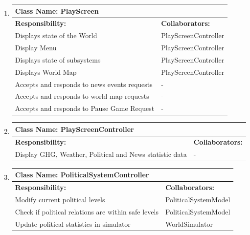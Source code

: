 \documentclass[]{article}
\begin{document}
\begin{enumerate}[1.]
\begin{tabular}{|p{10cm}|p{4cm}|}
	    \hline
	  \end{tabular}

	\item
	\begin{tabular}{|p{10cm}|p{4cm}|}
	    \hline
	     \multicolumn{2}{|l|}{\textbf{Class Name:  PlayScreen}} \\
	    \hline
	    \textbf{Responsibility:} & \textbf{Collaborators:} \\
	    \hline
	    Displays state of the World & PlayScreenController \\
	Display Menu & PlayScreenController \\
	Displays state of subsystems & PlayScreenController \\
	Displays World Map & PlayScreenController \\
	Accepts and responds to news events requests & - \\
	Accepts and responds to world map requests & - \\
	Accepts and responds to Pause Game Request & - \\

	    \hline
	  \end{tabular}

	\item
	\begin{tabular}{|p{10cm}|p{4cm}|}
	    \hline
	     \multicolumn{2}{|l|}{\textbf{Class Name:  PlayScreenController}} \\
	    \hline
	    \textbf{Responsibility:} & \textbf{Collaborators:} \\
	    \hline
	    Display GHG, Weather, Political and News statistic data & - \\

	    \hline
	  \end{tabular}

	\item
	\begin{tabular}{|p{10cm}|p{4cm}|}
	    \hline
	     \multicolumn{2}{|l|}{\textbf{Class Name:  PoliticalSystemController}} \\
	    \hline
	    \textbf{Responsibility:} & \textbf{Collaborators:} \\
	    \hline
	    Modify current political levels & PoliticalSystemModel \\
			Check if political relations are within safe levels & PoliticalSystemModel \\
	Update political statistics in simulator & WorldSimulator \\


\end{tabular}
\end{enumerate}
\end{document}
